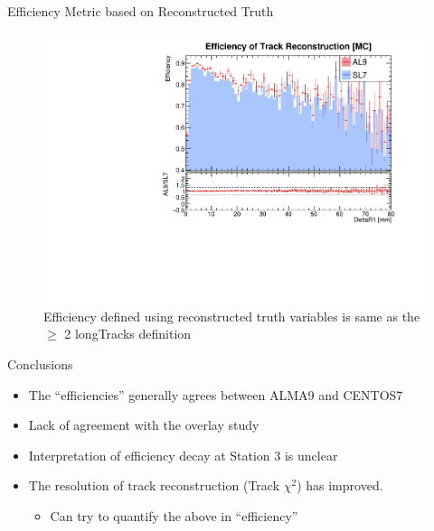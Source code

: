 \begin{frame}{Efficiency Metric based on Reconstructed Truth}
    \begin{figure}
        \includegraphics[width=0.9\linewidth]{output/NEffi_MC_pass_DeltaR1.pdf}
        \caption{Efficiency defined using reconstructed truth variables is same as the $\geq$ 2 longTracks definition}
    \end{figure}
    
\end{frame}

\begin{frame}{Conclusions}
    \begin{itemize}
        \small
        \item The ``efficiencies'' generally agrees between ALMA9 and CENTOS7
        \item Lack of agreement with the overlay study
        \item Interpretation of efficiency decay at Station 3 is unclear
        \item The resolution of track reconstruction (Track $\chi^2$) has improved.
        \begin{itemize}
            \item Can try to quantify the above in ``efficiency''
        \end{itemize}
    \end{itemize}
\end{frame}

    
